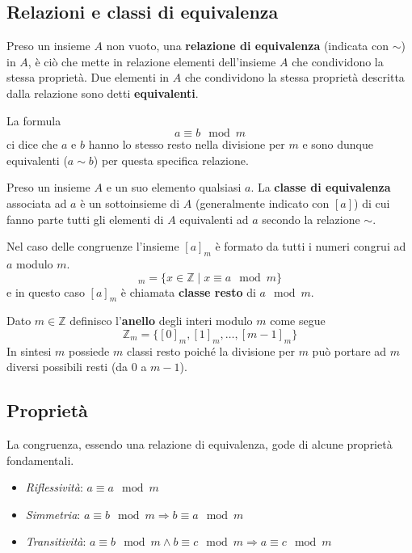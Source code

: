 \subsection{Relazioni e classi di equivalenza}

\begin{defn}
	Preso un insieme $A$ non vuoto, una \textbf{relazione di equivalenza} (indicata con $\sim$) in $A$,
	\`e ci\`o che mette in relazione elementi dell'insieme $A$ che condividono la stessa propriet\`a.
	Due elementi in $A$ che condividono la stessa propriet\`a descritta dalla relazione sono detti
	\textbf{equivalenti}.
\end{defn}

La formula
\begin{equation*}
	a \equiv b \mod{m}
\end{equation*}
ci dice che $a$ e $b$ hanno lo stesso resto nella divisione per $m$ e sono dunque
equivalenti ($a \sim b$) per questa specifica relazione.

\begin{defn}
	Preso un insieme $A$ e un suo elemento qualsiasi $a$. La \textbf{classe di equivalenza} associata
	ad $a$ \`e un sottoinsieme di $A$ (generalmente indicato con $[a]$) di cui fanno parte tutti gli
	elementi di $A$ equivalenti ad $a$ secondo la relazione $\sim$.
\end{defn}

Nel caso delle congruenze l'insieme $[a]_m$ \`e formato da tutti i numeri congrui ad $a$ modulo $m$.
\begin{equation*}
	[a]_m = \{ x \in \mathbb{Z} \mid x \equiv a \mod{m} \}
\end{equation*}
e in questo caso $[a]_m$ \`e chiamata \textbf{classe resto} di $a \mod{m}$.

\begin{defn}
	Dato $m \in \mathbb{Z}$ definisco l'\textbf{anello} degli interi modulo $m$ come segue
	\begin{equation*}
		\mathbb{Z}_m = \{ [0]_m, [1]_m, \dots, [m - 1]_m \}
	\end{equation*}
	In sintesi $m$ possiede $m$ classi resto poich\'e la divisione per $m$ pu\`o portare ad $m$ diversi
	possibili resti (da 0 a $m - 1$).
\end{defn}

\subsection{Propriet\`a}
La congruenza, essendo una relazione di equivalenza, gode di alcune propriet\`a fondamentali.
\begin{itemize}
	\item \emph{Riflessivit\`a}: $a \equiv a \mod{m}$
	\item \emph{Simmetria}: $a \equiv b \mod{m} \Rightarrow b \equiv a \mod{m}$
	\item \emph{Transitivit\`a}: $a \equiv b \mod{m} \wedge b \equiv c \mod{m} \Rightarrow
		      a \equiv c \mod{m}$
\end{itemize}

